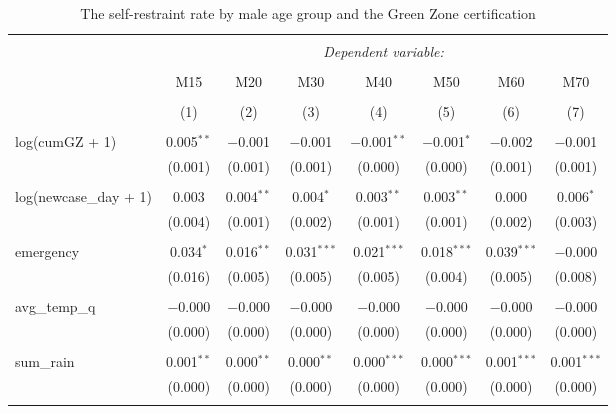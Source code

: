 
\begin{table}[!htbp] \centering 
  \caption{The self-restraint rate by male age group and the Green Zone certification} 
  \label{} 
\begin{tabular}{@{\extracolsep{5pt}}lccccccc} 
\\[-1.8ex]\hline 
\hline \\[-1.8ex] 
 & \multicolumn{7}{c}{\textit{Dependent variable:}} \\ 
\cline{2-8} 
\\[-1.8ex] & M15 & M20 & M30 & M40 & M50 & M60 & M70 \\ 
\\[-1.8ex] & (1) & (2) & (3) & (4) & (5) & (6) & (7)\\ 
\hline \\[-1.8ex] 
 log(cumGZ + 1) & 0.005$^{**}$ & $-$0.001 & $-$0.001 & $-$0.001$^{**}$ & $-$0.001$^{*}$ & $-$0.002 & $-$0.001 \\ 
  & (0.001) & (0.001) & (0.001) & (0.000) & (0.000) & (0.001) & (0.001) \\ 
  & & & & & & & \\ 
 log(newcase\_day + 1) & 0.003 & 0.004$^{**}$ & 0.004$^{*}$ & 0.003$^{**}$ & 0.003$^{**}$ & 0.000 & 0.006$^{*}$ \\ 
  & (0.004) & (0.001) & (0.002) & (0.001) & (0.001) & (0.002) & (0.003) \\ 
  & & & & & & & \\ 
 emergency & 0.034$^{*}$ & 0.016$^{**}$ & 0.031$^{***}$ & 0.021$^{***}$ & 0.018$^{***}$ & 0.039$^{***}$ & $-$0.000 \\ 
  & (0.016) & (0.005) & (0.005) & (0.005) & (0.004) & (0.005) & (0.008) \\ 
  & & & & & & & \\ 
 avg\_temp\_q & $-$0.000 & $-$0.000 & $-$0.000 & $-$0.000 & $-$0.000 & $-$0.000 & $-$0.000 \\ 
  & (0.000) & (0.000) & (0.000) & (0.000) & (0.000) & (0.000) & (0.000) \\ 
  & & & & & & & \\ 
 sum\_rain & 0.001$^{**}$ & 0.000$^{**}$ & 0.000$^{**}$ & 0.000$^{***}$ & 0.000$^{***}$ & 0.001$^{***}$ & 0.001$^{***}$ \\ 
  & (0.000) & (0.000) & (0.000) & (0.000) & (0.000) & (0.000) & (0.000) \\ 
  & & & & & & & \\ 

\end{tabular}
\end{table}
